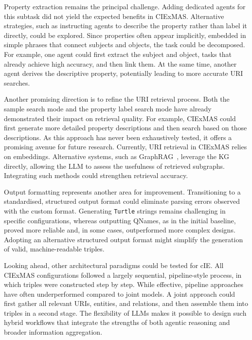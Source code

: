 \documentclass[a4paper,oneside,bibliography=totoc]{scrbook}
\begin{document}
Property extraction remains the principal challenge. Adding dedicated agents for this subtask did not yield the expected benefits in CIExMAS. Alternative strategies, such as instructing agents to describe the property rather than label it directly, could be explored. Since properties often appear implicitly, embedded in simple phrases that connect subjects and objects, the task could be decomposed. For example, one agent could first extract the subject and object, tasks that already achieve high accuracy, and then link them. At the same time, another agent derives the descriptive property, potentially leading to more accurate \ac{URI} searches.

Another promising direction is to refine the \ac{URI} retrieval process. Both the sample search mode and the property label search mode have already demonstrated their impact on retrieval quality. For example, CIExMAS could first generate more detailed property descriptions and then search based on those descriptions. As this approach has never been exhaustively tested, it offers a promising avenue for future research. Currently, \ac{URI} retrieval in CIExMAS relies on embeddings. Alternative systems, such as GraphRAG~\cite{Edge2025}, leverage the \ac{KG} directly, allowing the \ac{LLM} to assess the usefulness of retrieved subgraphs. Integrating such methods could strengthen retrieval accuracy.

Output formatting represents another area for improvement. Transitioning to a standardised, structured output format could eliminate parsing errors observed with the custom format. Generating \texttt{Turtle} strings remains challenging in specific configurations, whereas outputting QNames, as in the initial baseline, proved more reliable and, in some cases, outperformed more complex designs. Adopting an alternative structured output format might simplify the generation of valid, machine-readable triples.

Looking ahead, other architectural paradigms could be tested for \ac{cIE}. All CIExMAS configurations followed a largely sequential, pipeline-style process, in which triples were constructed step by step. While effective, pipeline approaches have often underperformed compared to joint models. A joint approach could first gather all relevant \acp{URI}, entities, and relations, and then assemble them into triples in a second stage. The flexibility of \acp{LLM} makes it possible to design such hybrid workflows that integrate the strengths of both agentic reasoning and broader information aggregation.
\end{document}
